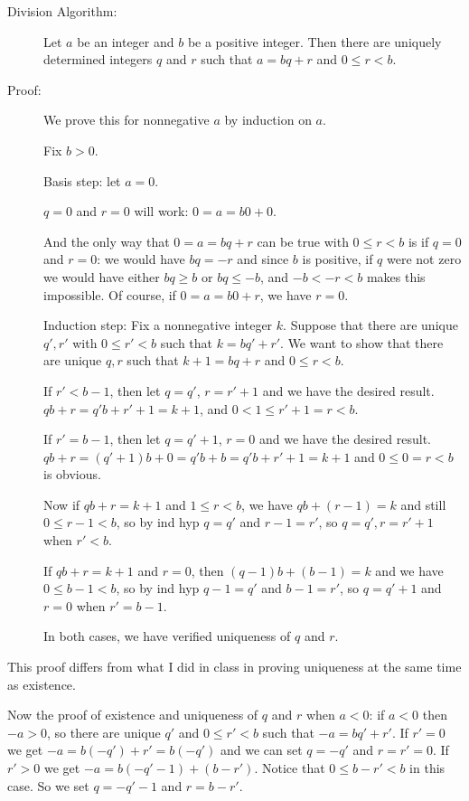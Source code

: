 \documentclass[12pt]{article}
\begin{document}
\begin{description}

\item[Division Algorithm:]  Let $a$ be an integer and $b$ be a positive integer.  Then there are uniquely determined integers $q$ and $r$ such that $a=bq+r$ and $0 \leq r <b$.

\item[Proof:]   We prove this for nonnegative $a$ by induction on $a$.

Fix $b>0$.

Basis step:  let $a=0$.

$q=0$ and $r=0$ will work:  $0=a=b0 + 0$.  

And the only way that $0=a=bq+r$ can be true with
$0 \leq r < b$ is if $q=0$ and $r=0$:  we would have $bq = -r$ and since $b$ is positive, if $q$ were not zero we would have either $bq\geq b$ or $bq\leq -b$, and $-b < -r < b$ makes this impossible.  Of course, if $0=a=b0+r$, we have $r=0$.

Induction step:  Fix a nonnegative integer $k$.  Suppose that there are unique $q',r'$ with $0 \leq r' <b$ such that
$k=bq'+r'$.  We want to show that there are unique $q,r$ such that $k+1 = bq+r$ and $0 \leq r <b$.

If $r'<b-1$, then let $q=q'$, $r=r'+1$ and we have the desired result.  $qb+r = q'b+r'+1 = k + 1$, and 
$0<1 \leq r'+1 = r<b$.

If $r'=b-1$, then let $q=q'+1$, $r=0$ and we have the desired result.   $qb+r = (q'+1)b +0 = q'b+b = q'b+r'+1 = k+1$ and $0 \leq 0 = r <b$ is obvious.

Now if $qb+r = k+1$ and $1 \leq r <b$, we have $qb+(r-1) = k$ and still $0 \leq r-1<b$, so by ind hyp $q=q'$ and $r-1=r'$, so $q=q', r=r'+1$ when $r'<b$.

If $qb+r = k+1$ and $r=0$, then $(q-1)b+(b-1)=k$ and we have $0 \leq b-1 <b$, so by ind hyp
$q-1 = q'$ and $b-1=r'$, so $q=q'+1$ and $r=0$ when $r'=b-1$.

In both cases, we have verified uniqueness of $q$ and $r$.


\end{description}

This proof differs from what I did in class in proving uniqueness at the same time as existence.

Now the proof of existence and uniqueness of $q$ and $r$ when $a<0$:  if $a<0$ then $-a>0$, so there are unique
$q'$ and $0 \leq r'<b$ such that $-a = bq' + r'$.  If $r'=0$ we get $-a=b(-q') + r' = b(-q')$ and we can
set $q = -q'$ and $r=r'=0$.  If $r'>0$ we get $-a = b(-q'-1)+(b-r')$.  Notice that $0 \leq b-r' <b$ in this case.
So we set $q=-q'-1$ and $r=b-r'$.  
\end{document}
